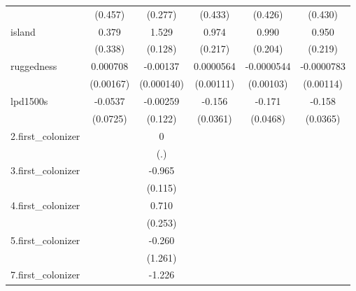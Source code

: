 {\begin{tabular}{l*{5}{c}}
            &     (0.457)         &     (0.277)         &     (0.433)         &     (0.426)         &     (0.430)         \\
[1em]
island      &       0.379         &       1.529\sym{***}&       0.974\sym{***}&       0.990\sym{***}&       0.950\sym{***}\\
            &     (0.338)         &     (0.128)         &     (0.217)         &     (0.204)         &     (0.219)         \\
[1em]
ruggedness  &    0.000708         &    -0.00137\sym{***}&   0.0000564         &  -0.0000544         &  -0.0000783         \\
            &   (0.00167)         &  (0.000140)         &   (0.00111)         &   (0.00103)         &   (0.00114)         \\
[1em]
lpd1500s    &     -0.0537         &    -0.00259         &      -0.156\sym{***}&      -0.171\sym{**} &      -0.158\sym{***}\\
            &    (0.0725)         &     (0.122)         &    (0.0361)         &    (0.0468)         &    (0.0365)         \\
[1em]
2.first\_colonizer&                     &           0         &                     &                     &                     \\
            &                     &         (.)         &                     &                     &                     \\
[1em]
3.first\_colonizer&                     &      -0.965\sym{***}&                     &                     &                     \\
            &                     &     (0.115)         &                     &                     &                     \\
[1em]
4.first\_colonizer&                     &       0.710\sym{**} &                     &                     &                     \\
            &                     &     (0.253)         &                     &                     &                     \\
[1em]
5.first\_colonizer&                     &      -0.260         &                     &                     &                     \\
            &                     &     (1.261)         &                     &                     &                     \\
[1em]
7.first\_colonizer&                     &      -1.226         &                     &                     &                     \\

\end{tabular}}
